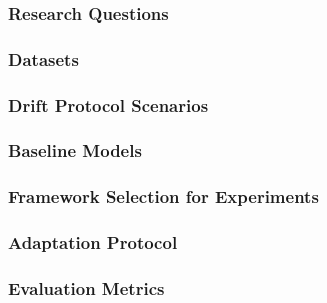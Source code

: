 \documentclass[conference]{IEEEtran}
\begin{document}
\subsubsection{Research Questions}

\subsubsection{Datasets}

\subsubsection{Drift Protocol Scenarios}

\subsubsection{Baseline Models}

\subsubsection{Framework Selection for Experiments}

\subsubsection{Adaptation Protocol}

\subsubsection{Evaluation Metrics}
\end{document}
